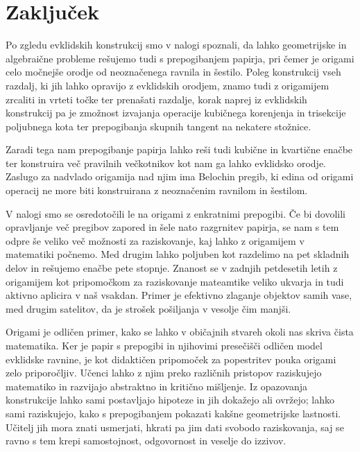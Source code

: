 \section{Zaključek}

Po zgledu evklidskih konstrukcij smo v nalogi spoznali, da lahko geometrijske in algebraične probleme rešujemo tudi s prepogibanjem papirja, pri čemer je origami celo močnejše orodje od neoznačenega ravnila in šestilo. Poleg konstrukcij vseh razdalj, ki jih lahko opravijo z evklidskih orodjem, znamo tudi z origamijem zrcaliti in vrteti točke ter prenašati razdalje, korak naprej iz evklidskih konstrukcij pa je zmožnost izvajanja operacije kubičnega korenjenja in trisekcije poljubnega kota ter prepogibanja skupnih tangent na nekatere stožnice.

Zaradi tega nam prepogibanje papirja lahko reši tudi kubične in kvartične enačbe ter konstruira več pravilnih večkotnikov kot nam ga lahko evklidsko orodje. Zaslugo za nadvlado origamija nad njim ima Belochin pregib, ki edina od origami operacij ne more biti konstruirana z neoznačenim ravnilom in šestilom.

V nalogi smo se osredotočili le na origami z enkratnimi prepogibi. Če bi dovolili opravljanje več pregibov zapored in šele nato razgrnitev papirja, se nam s tem odpre še veliko več možnosti za raziskovanje, kaj lahko z origamijem v matematiki počnemo. Med drugim lahko poljuben kot razdelimo na pet skladnih delov in rešujemo enačbe pete stopnje. Znanost se v zadnjih petdesetih letih z origamijem kot pripomočkom za raziskovanje mateamtike veliko ukvarja in tudi aktivno aplicira v naš vsakdan. Primer je efektivno zlaganje objektov samih vase, med drugim satelitov, da je strošek pošiljanja v vesolje čim manjši.

Origami je odličen primer, kako se lahko v običajnih stvareh okoli nas skriva čista matematika. Ker je papir s prepogibi in njihovimi presečišči odličen model evklidske ravnine, je kot didaktičen pripomoček za popestritev pouka origami zelo priporočljiv. Učenci lahko z njim preko različnih pristopov raziskujejo matematiko in razvijajo abstraktno in kritično mišljenje. Iz opazovanja konstrukcije lahko sami postavljajo hipoteze in jih dokažejo ali ovržejo; lahko sami raziskujejo, kako s prepogibanjem pokazati kakšne geometrijske lastnosti. Učitelj jih mora znati usmerjati, hkrati pa jim dati svobodo raziskovanja, saj se ravno s tem krepi samostojnost, odgovornost in veselje do izzivov.